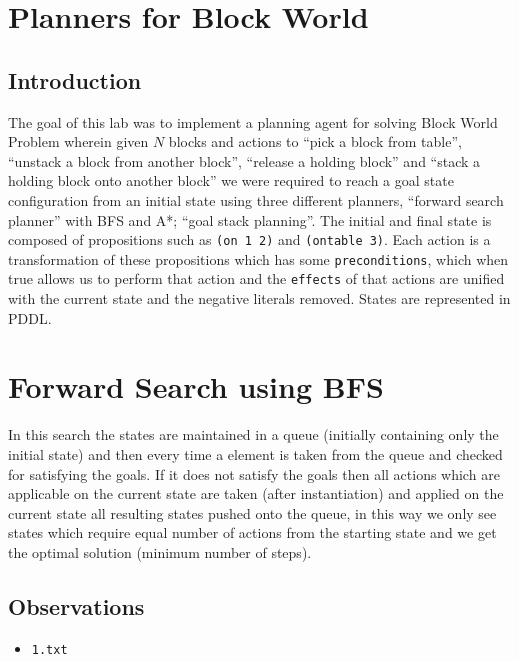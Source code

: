 \documentclass{article}
\begin{document}
\maketitle
\section{Planners for Block World}
\subsection{Introduction}
The goal of this lab was to implement a planning agent for solving Block World Problem wherein given $N$ blocks and actions to ``pick a block from table'', ``unstack a block from another block'', ``release a holding block'' and ``stack a holding block onto another block'' we were required to reach a goal state configuration from an initial state using three different planners, ``forward search planner'' with BFS and A*; ``goal stack planning''. The initial and final state is composed of propositions such as \verb|(on 1 2)| and \verb|(ontable 3)|. Each action is a transformation of these propositions which has some \verb|preconditions|, which when true allows us to perform that action and the \verb|effects| of that actions are unified with the current state and the negative literals removed. States are represented in PDDL.

\section{Forward Search using BFS}
In this search the states are maintained in a queue (initially containing only the initial state) and then every time a element is taken from the queue and checked for satisfying the goals. If it does not satisfy the goals then all actions which are applicable on the current state are taken (after instantiation) and applied on the current state all resulting states pushed onto the queue, in this way we only see states which require equal number of actions from the starting state and we get the optimal solution (minimum number of steps).

\subsection*{Observations}
\begin{itemize}
\item \verb|1.txt|
\end{itemize}
\end{document}
